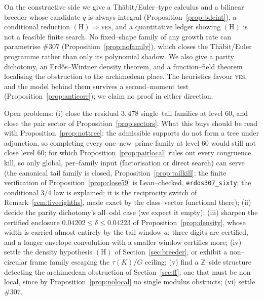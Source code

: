 \documentclass[11pt]{article}
\theoremstyle{definition}
\begin{document}
On the constructive side we give a Th\=abit/Euler--type calculus and a bilinear breeder whose
candidate $q$ is always integral (Proposition~\ref{prop:bdeint}), a conditional reduction
$(\mathrm{H})\Rightarrow$\textsc{yes}, and a quantitative ledger showing $(\mathrm{H})$ is not a
feasible finite search. No fixed--shape family of any growth rate can parametrise \#307
(Proposition~\ref{prop:nofamily}), which closes the Th\=abit/Euler programme rather than only its
polynomial shadow. We also give a parity dichotomy, an Erd\H{o}s--Wintner density theorem, and a
function--field theorem localising the obstruction to the archimedean place. The heuristics favour
\textsc{yes}, and the model behind them survives a second--moment test
(Proposition~\ref{prop:anticorr}); we claim no proof in either direction.

Open problems: (i) close the residual $3{,}478$ single--tail families at level $60$, and close the
pair sector of Proposition~\ref{prop:sectors}. What this buys should be read with
Proposition~\ref{prop:nottree}: the admissible supports do not form a tree under adjunction, so
completing every one--new--prime family at level $60$ would still not close level $60$; for which Proposition~\ref{prop:pairlocal} rules
out every congruence kill, so only global, per--family input (factorisation or direct search) can
serve (the canonical tail family
is closed, Proposition~\ref{prop:tailkill}; the finite verification of
Proposition~\ref{prop:close59} is Lean--checked, \texttt{erdos307\_sixty}; the conditional $3/4$
law is explained; it is the reciprocity switch of Remark~\ref{rem:fiveeighths}, made exact by
the class--vector functional there); (ii) decide
the parity dichotomy's all--odd case (we expect it empty); (iii) sharpen the certified enclosure
$0.04202\le\delta\le0.04223$ of Proposition~\ref{prop:density}, whose width is carried almost
entirely by the tail window $a$; three digits are certified, and a longer envelope convolution
with a smaller window certifies more; (iv) settle the density hypothesis $(\mathrm{H})$ of
Section~\ref{sec:breeder}, or exhibit a non--circular frame family escaping the $\tau(K)/G$ ceiling;
(v) find a $\mathbb{Z}$--side structure detecting the archimedean obstruction of
Section~\ref{sec:ff}; one that must be non--local, since by Proposition~\ref{prop:nolocal} no single
modulus obstructs; (vi) settle \#307.
\end{document}
